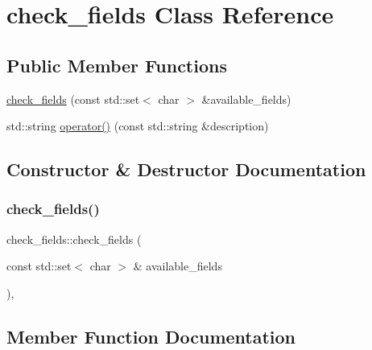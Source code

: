 \hypertarget{classcheck__fields}{}\section{check\+\_\+fields Class Reference}
\label{classcheck__fields}
\subsection*{Public Member Functions}
\begin{DoxyCompactItemize}
\item 
\mbox{\hyperlink{classcheck__fields_a37a0409898667aad8601e57685252870}{check\+\_\+fields}} (const std\+::set$<$ char $>$ \&available\+\_\+fields)
\item 
std\+::string \mbox{\hyperlink{classcheck__fields_a7c9211374f47a59c3b796a1036bf3d96}{operator()}} (const std\+::string \&description)
\end{DoxyCompactItemize}


\subsection{Constructor \& Destructor Documentation}
\mbox{\label{classcheck__fields_a37a0409898667aad8601e57685252870}} 
\subsubsection{\texorpdfstring{check\+\_\+fields()}{check\_fields()}}
{\footnotesize\ttfamily check\+\_\+fields\+::check\+\_\+fields (\begin{DoxyParamCaption}\item[{const std\+::set$<$ char $>$ \&}]{available\+\_\+fields }\end{DoxyParamCaption})\hspace{0.3cm}{\ttfamily [inline]}, {\ttfamily [explicit]}}



\subsection{Member Function Documentation}
\mbox{\label{classcheck__fields_a7c9211374f47a59c3b796a1036bf3d96}} 
